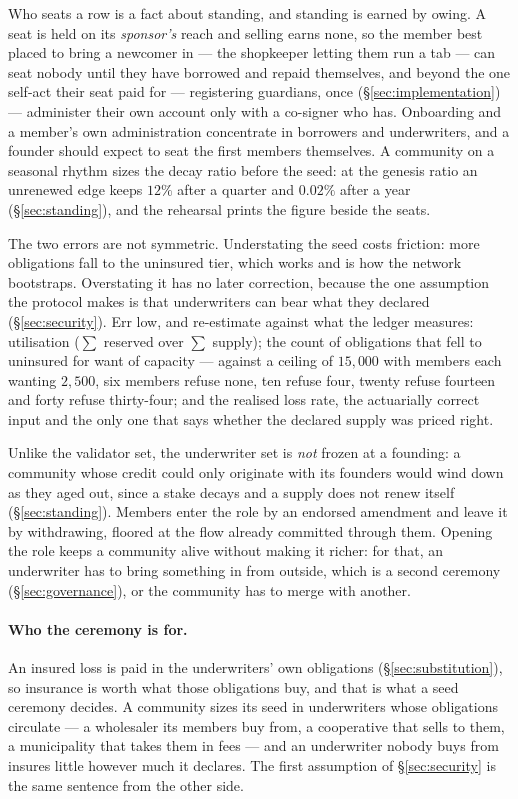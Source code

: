 Who seats a row is a fact about standing, and standing is earned by owing. A seat is held
on its \emph{sponsor's} reach and selling earns none, so the member best placed to bring a
newcomer in --- the shopkeeper letting them run a tab --- can seat nobody until they have
borrowed and repaid themselves, and beyond the one self-act their seat paid for ---
registering guardians, once (\S\ref{sec:implementation}) --- administer their own account
only with a co-signer who has. Onboarding and a member's own administration concentrate
in borrowers and underwriters, and a founder should expect to seat the first members
themselves. A community on a seasonal rhythm sizes the decay ratio before the seed: at the
genesis ratio an unrenewed edge keeps $12\%$ after a quarter and $0.02\%$ after a year
(\S\ref{sec:standing}), and the rehearsal prints the figure beside the seats.

The two errors are not symmetric. Understating the seed costs friction: more obligations
fall to the uninsured tier, which works and is how the network bootstraps. Overstating it
has no later correction, because the one assumption the protocol makes is that
underwriters can bear what they declared (\S\ref{sec:security}). Err low, and re-estimate
against what the ledger measures: utilisation ($\sum$ reserved over $\sum$ supply); the
count of obligations that fell to uninsured for want of capacity --- against a ceiling of
$15{,}000$ with members each wanting $2{,}500$, six members refuse none, ten refuse four,
twenty refuse fourteen and forty refuse thirty-four; and the realised loss rate, the
actuarially correct input and the only one that says whether the declared supply was
priced right.

Unlike the validator set, the underwriter set is \emph{not} frozen at a founding: a
community whose credit could only originate with its founders would wind down as they
aged out, since a stake decays and a supply does not renew itself
(\S\ref{sec:standing}). Members enter the role by an endorsed amendment and leave it by
withdrawing, floored at the flow already committed through them. Opening the role keeps a
community alive without making it richer: for that, an underwriter has to bring something
in from outside, which is a second ceremony (\S\ref{sec:governance}), or the community has
to merge with another.

\paragraph{Who the ceremony is for.} An insured loss is paid in the underwriters' own
obligations (\S\ref{sec:substitution}), so insurance is worth what those obligations buy,
and that is what a seed ceremony decides. A community sizes its seed in underwriters whose
obligations circulate --- a wholesaler its members buy from, a cooperative that sells to
them, a municipality that takes them in fees --- and an underwriter nobody buys from
insures little however much it declares. The first assumption of \S\ref{sec:security} is
the same sentence from the other side.

